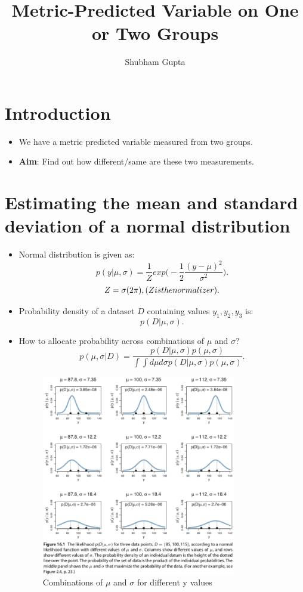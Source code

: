 \documentclass[a4paper]{article}
\title{Metric-Predicted Variable on One or Two Groups}
\author{Shubham Gupta}
\begin{document}
\maketitle
\section{Introduction}
\begin{itemize}
    \item We have a metric predicted variable measured from two groups.
    \item \textbf{Aim}: Find out how different/same are these two measurements. 
\end{itemize}
\section{Estimating the mean and standard deviation of a normal distribution}
\begin{itemize}
    \item Normal distribution is given as:
    \[
        p(y|\mu, \sigma) = \frac{1}{Z}exp\bigg(-\frac{1}{2} \frac{(y-\mu)^2}{\sigma^2}\bigg)
    .\] 
    \[
        Z = \sigma(2\pi), \text(Z is the normalizer)
    .\] 
    \item Probability density of a dataset $D$ containing values $y_1, y_2, y_3$ is:
    \[
        p(D|\mu, \sigma)
    .\] 
    \item How to allocate probability across combinations of $\mu$ and $\sigma$?
    \[
        p(\mu, \sigma | D) = \frac{p(D|\mu, \sigma) p(\mu, \sigma)}{\int\int d\mu d\sigma p(D|\mu, \sigma) p(\mu, \sigma)}
    .\] 
    \begin{figure}[H]
        \centering
        \includegraphics[width=0.8\textwidth]{mu_sigma_combinations}
        \caption{Combinations of $\mu$ and $\sigma$ for different y values}
        \label{fig:mu_sigma_combinations}
    \end{figure}
\end{itemize}
\end{document}
